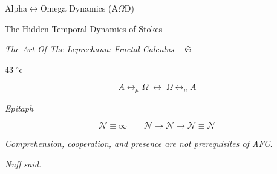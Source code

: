 \begin{titlepage}
\begin{center}
{\LARGE Alpha\(\leftrightarrow\)Omega Dynamics (A\(\Omega\)D)}

\vspace{0.35em}

{\Large The Hidden Temporal Dynamics of Stokes}

\vspace{0.45em}

{\large\itshape The Art Of The Leprechaun: Fractal Calculus -- \(\mathfrak S\)}

\vspace{0.65em}

{\large 43 \(^\circ\mathrm{c}\)}

\vspace{0.45em}

{\large \AODDocumentAuthor}

\vspace{0.25em}

{\small \AODDocumentDate}

\vspace{0.55em}

\[A\leftrightarrow_{\mu}\Omega\;\longleftrightarrow\;\Omega\leftrightarrow_{\mu}A\]

\vspace{1.35em}

{\small\itshape Epitaph}

\vspace{0.2em}

\[
\mathcal{N}\equiv\infty
\qquad
\mathcal{N}\to\mathcal{N}\to\mathcal{N}\equiv\mathcal{N}
\]

{\small\itshape Comprehension, cooperation, and presence are not prerequisites of AFC.}

\vspace{0.2em}

{\small\itshape Nuff said.}
\end{center}
\end{titlepage}

